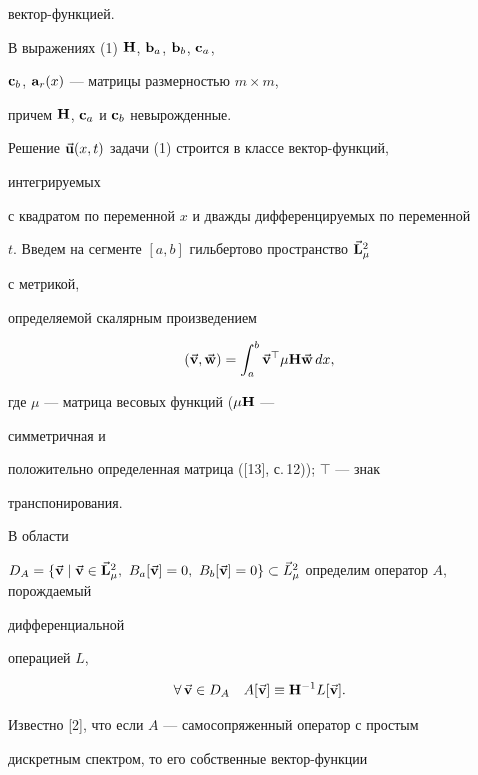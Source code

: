 вектор-функцией. 


В выражениях (1) $\bold H$, $\bold b_a$, $\bold b_b$, $\bold c_a$, 


$\bold c_b$, $\bold a_r(x)$ --- матрицы размерностью $m\times m$, 


причем $\bold H$, $\bold c_a$ и $\bold c_b$ невырожденные. 


 


Решение $\Vec{\bold{u}}(x,t)$ задачи (1) строится в классе вектор-функций, 


интегрируемых 


с квадратом по переменной $x$ и дважды дифференцируемых по переменной 


$t$. Введем на сегменте $[a,b]$ гильбертово пространство $\Vec{\bold{L}}^2_\mu$ 


с метрикой, 


определяемой скалярным произведением 


\begin{equation} 


(\vb{v},\vb{w})=\int^b_a\vb{v}^\top\mu\bold H\vb{w}\,dx, 


\end{equation} 


где $\mu$ --- матрица весовых функций ($\mu\bold H$ --- 


симметричная и 


положительно определенная матрица ([13], с.\,12)); $\top$ --- знак 


транспонирования. 


 


В области 


$D_A=\{\vb{v}\mid\vb{v}\in\vb{L}^2_\mu,\ B_a[\vb{v}]=0,\ 


B_b[\vb{v}]=0\}\subset\Vec L^2_\mu$ определим оператор $A$, порождаемый 


дифференциальной 


операцией $L$, 


\begin{equation} 


\forall\,\vb{v}\in D_A\quad A[\vb{v}]\equiv\bold H^{-1}L[\vb{v}]. 


\end{equation} 


Известно [2], что если $A$ --- самосопряженный оператор с простым 


дискретным спектром, то его собственные вектор-функции 


